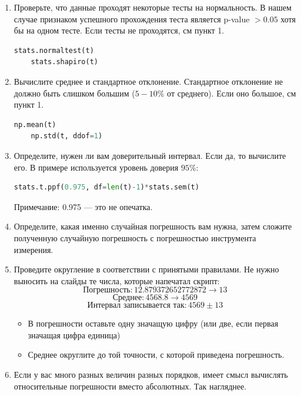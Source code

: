 \documentclass{article}
\begin{document}
\begin {enumerate}
\item Проверьте, что данные проходят некоторые тесты на нормальность. В нашем случае признаком успешного прохождения теста является p-value $> 0.05$ хотя бы на одном тесте. Если тесты не проходятся, см пункт 1.
\begin{lstlisting}[language=Python]
	stats.normaltest(t)
	stats.shapiro(t)
\end{lstlisting}

\item Вычислите среднее и стандартное отклонение. Стандартное отклонение не должно быть слишком большим ($5-10\%$ от среднего). Если оно большое, см пункт 1.
\begin{lstlisting}[language=Python]
	np.mean(t)
	np.std(t, ddof=1)
\end{lstlisting}

\item Определите, нужен ли вам доверительный интервал. Если да, то вычислите его. В примере используется уровень доверия $95\%$:
\begin{lstlisting}[language=Python]
	stats.t.ppf(0.975, df=len(t)-1)*stats.sem(t)
\end{lstlisting}
Примечание: 0.975 --- это не опечатка.

\item Определите, какая именно случайная погрешность вам нужна, затем сложите полученную случайную погрешность с погрешностью инструмента измерения.

\item Проведите округление в соответствии с принятыми правилами. Не нужно выносить на слайды те числа, которые напечатал скрипт:
$$ \text{Погрешность}: 12.879372652772872 \rightarrow 13 $$
$$ \text{Среднее}: 4568.8 \rightarrow 4569 $$
$$ \text{Интервал записывается так}: 4569 \pm 13 $$
\begin{itemize}
\item В погрешности оставьте одну значащую цифру (или две, если первая значащая цифра единица)
\item Среднее округлите до той точности, с которой приведена погрешность.
\end{itemize}

\item Если у вас много разных величин разных порядков, имеет смысл вычислять относительные погрешности вместо абсолютных. Так нагляднее.
\end{enumerate}
\end{document}

